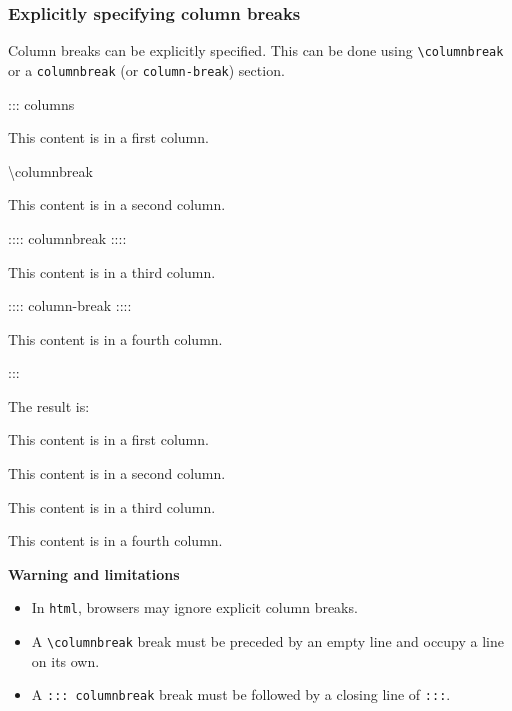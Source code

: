 \documentclass[
]{article}
\newenvironment{Shaded}{}{}
\newcommand{\NormalTok}[1]{#1}
\providecommand{\tightlist}{%
  \setlength{\itemsep}{0pt}\setlength{\parskip}{0pt}}
\begin{document}
\hypertarget{explicitly-specifying-column-breaks}{%
\subsubsection{Explicitly specifying column
breaks}\label{explicitly-specifying-column-breaks}}

Column breaks can be explicitly specified. This can be done using
\texttt{\textbackslash{}columnbreak} or a \texttt{columnbreak} (or
\texttt{column-break}) section.

\begin{Shaded}
\begin{Highlighting}[]
\NormalTok{::: columns}

\NormalTok{This content is in a first column.}

\NormalTok{\textbackslash{}columnbreak}

\NormalTok{This content is in a second column.}

\NormalTok{:::: columnbreak}
\NormalTok{::::}

\NormalTok{This content is in a third column.}

\NormalTok{:::: column{-}break}
\NormalTok{::::}

\NormalTok{This content is in a fourth column.}

\NormalTok{:::}
\end{Highlighting}
\end{Shaded}

The result is:

{\begin{multicols}{4}

This content is in a first column.

\columnbreak

This content is in a second column.

\columnbreak

This content is in a third column.

\columnbreak

This content is in a fourth column.

\end{multicols}
}

\textbf{Warning and limitations}

\begin{itemize}
\tightlist
\item
  In \texttt{html}, browsers may ignore explicit column breaks.
\item
  A \texttt{\textbackslash{}columnbreak} break must be preceded by an
  empty line and occupy a line on its own.
\item
  A \texttt{:::\ columnbreak} break must be followed by a closing line
  of \texttt{:::}.
\end{itemize}
\end{document}
